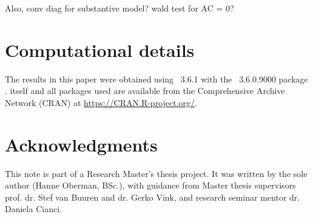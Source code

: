 \documentclass[article]{jss}
\begin{document}
Also, conv diag for substantive model? wald test for AC = 0? 

\section*{Computational details}

The results in this paper were obtained using ~3.6.1 \cite{R} with the ~3.6.0.9000 package \cite{mice}.  itself and all packages used are available from the Comprehensive  Archive Network (CRAN) at \url{https://CRAN.R-project.org/}.


\section*{Acknowledgments}

This note is part of a Research Master's thesis project. It was written by the sole author (Hanne Oberman, BSc.), with guidance from Master thesis supervisors prof. dr. Stef van Buuren and dr. Gerko Vink, and research seminar mentor dr. Daniela Cianci. 







\newpage

\begin{appendix}

\end{appendix}

\end{document}
